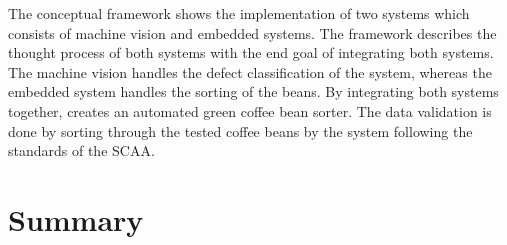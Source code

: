 The conceptual framework shows the implementation of two systems which consists of machine vision and embedded systems. The framework describes the thought process of both systems with the end goal of integrating both systems. The machine vision handles the defect classification of the system, whereas the embedded system handles the sorting of the beans. By integrating both systems together, creates an automated green coffee bean sorter. The data validation is done by sorting through the tested coffee beans by the system following the standards of the SCAA.

\section{Summary}